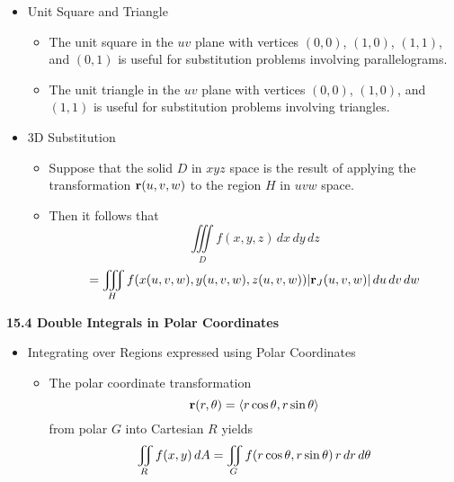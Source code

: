 \begin{itemize}
  \newpage

  \item Unit Square and Triangle

    \begin{itemize}
      \item The unit square in the $uv$ plane with vertices $(0,0)$, $(1,0)$, $(1,1)$, and $(0,1)$ is useful for substitution problems involving parallelograms.
      \item The unit triangle in the $uv$ plane with vertices $(0,0)$, $(1,0)$, and $(1,1)$ is useful for substitution problems involving triangles.
    \end{itemize}
    
  \item 3D Substitution
  
    \begin{itemize}
    \item Suppose that the solid $D$ in $xyz$ space is the result of applying the transformation $\mathbf{r}(u,v,w)$ to the region $H$ in $uvw$ space.
    \item Then it follows that \[\iiint\limits_D f(x,y,z)\,dx\,dy\,dz \]\[= \iiint\limits_H f(x(u,v,w),y(u,v,w),z(u,v,w))|\mathbf{r}_J(u,v,w)|\,du\,dv\,dw\]
    \end{itemize}
        
  
    
  \end{itemize}
  
\newpage

\centerline{\bf 15.4 Double Integrals in Polar Coordinates}
  
  \begin{itemize}
  
  \item Integrating over Regions expressed using Polar Coordinates
    
    \begin{itemize}
    \item The polar coordinate transformation \[\mathbf{r}(r,\theta) = \left<r\cos\theta, r\sin\theta\right>\] from polar $G$ into Cartesian $R$ yields \[\iint\limits_R f(x,y)\, dA = \iint\limits_G f(r\cos\theta,r\sin\theta)\,r\,d{r}\,d{\theta}\]
    \end{itemize}
      
  
    
  \end{itemize}
  
